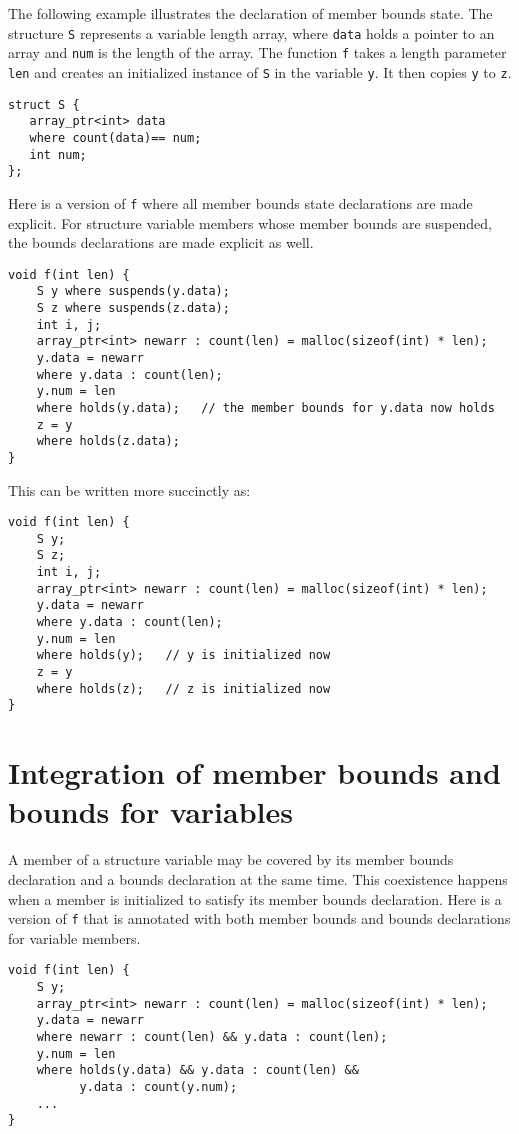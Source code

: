 The following example illustrates the declaration of member bounds
state. The structure \texttt{S} represents a variable length array,
where \texttt{data} holds a pointer to an array and \texttt{num} is the 
length of the array. The function \texttt{f} takes a length parameter  
\texttt{len} and creates an initialized instance of \texttt{S} in the 
variable \texttt{y}.  It then copies \texttt{y} to \texttt{z}.

\begin{verbatim}
struct S {
   array_ptr<int> data
   where count(data)== num;
   int num;
};
\end{verbatim}

Here is a version of \texttt{f} where all member bounds state declarations are
made explicit. For structure variable members whose member bounds are
suspended, the bounds declarations are made explicit as well.

\begin{verbatim}
void f(int len) {
    S y where suspends(y.data);
    S z where suspends(z.data);
    int i, j;
    array_ptr<int> newarr : count(len) = malloc(sizeof(int) * len);
    y.data = newarr
    where y.data : count(len);
    y.num = len
    where holds(y.data);   // the member bounds for y.data now holds
    z = y
    where holds(z.data);
}
\end{verbatim}

This can be written more succinctly as:

\begin{verbatim}
void f(int len) {
    S y;
    S z;
    int i, j;
    array_ptr<int> newarr : count(len) = malloc(sizeof(int) * len);
    y.data = newarr
    where y.data : count(len);
    y.num = len
    where holds(y);   // y is initialized now
    z = y
    where holds(z);   // z is initialized now
}
\end{verbatim}

\section{Integration of member bounds and bounds for variables}

A member of a structure variable may be covered by its member bounds
declaration and a bounds declaration at the same time. This coexistence
happens when a member is initialized to satisfy its member bounds
declaration. Here is a version of \texttt{f} that is annotated with both member
bounds and bounds declarations for variable members.
\begin{verbatim}
void f(int len) {
    S y;
    array_ptr<int> newarr : count(len) = malloc(sizeof(int) * len);
    y.data = newarr
    where newarr : count(len) && y.data : count(len);
    y.num = len
    where holds(y.data) && y.data : count(len) && 
          y.data : count(y.num);
    ...
}
\end{verbatim}

